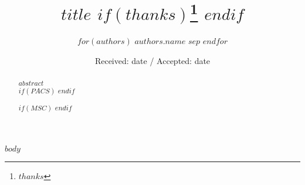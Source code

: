 \documentclass[$classoption$]{svjour3} %
\title{$title$ $if(thanks)$\thanks{$thanks$} $endif$}
\author{ $for(authors)$ $authors.name$ $sep$ $endfor$ }
\institute{
    $for(authors)$
    $authors.name$ \at
    $if(authors.address)$ $authors.address$ $endif$\\
    $if(authors.email)$ \email{$authors.email$} $endif$
    $sep$
    $endfor$
}
\date{Received: date / Accepted: date}
\begin{document}
\maketitle

\begin{abstract}
$abstract$
\\
$if(PACS)$
$endif$

$if(MSC)$
$endif$

\end{abstract}

\def\spacingset#1{\renewcommand{\baselinestretch}%
{#1}\small\normalsize} \spacingset{1}

$body$


\end{document}
